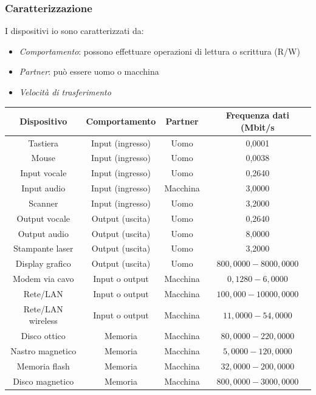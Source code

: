 \subsubsection*{Caratterizzazione}
I dispositivi io sono caratterizzati da:
\begin{itemize}
	\item \textit{Comportamento}: possono effettuare operazioni di lettura o scrittura (R/W)
	\item \textit{Partner}: può essere uomo o macchina
	\item \textit{Velocità di trasferimento}
\end{itemize}
\begin{center}
	\begin{tabular}{|c|c|c|c|}
		\hline Dispositivo & Comportamento    & Partner  & Frequenza dati (Mbit/s \\
		\hline Tastiera    & Input (ingresso) & Uomo     & 0,0001                 \\
		Mouse              & Input (ingresso) & Uomo     & 0,0038                 \\
		Input vocale       & Input (ingresso) & Uomo     & 0,2640                 \\
		Input audio        & Input (ingresso) & Macchina & 3,0000                 \\
		Scanner            & Input (ingresso) & Uomo     & 3,2000                 \\
		Output vocale      & Output (uscita)  & Uomo     & 0,2640                 \\
		Output audio       & Output (uscita)  & Uomo     & 8,0000                 \\
		Stampante laser    & Output (uscita)  & Uomo     & 3,2000                 \\
		Display grafico    & Output (uscita)  & Uomo     & $800,0000-8000,0000$   \\
		Modem via cavo     & Input o output   & Macchina & $0,1280-6,0000$        \\
		Rete/LAN           & Input o output   & Macchina & $100,000-10000,0000$   \\
		Rete/LAN wireless  & Input o output   & Macchina & $11,0000-54,0000$      \\
		Disco ottico       & Memoria          & Macchina & $80,0000-220,0000$     \\
		Nastro magnetico   & Memoria          & Macchina & $5,0000-120,0000$      \\
		Memoria flash      & Memoria          & Macchina & $32,0000-200,0000$     \\
		Disco magnetico    & Memoria          & Macchina & $800,0000-3000,0000$   \\
		\hline
	\end{tabular}
\end{center}
